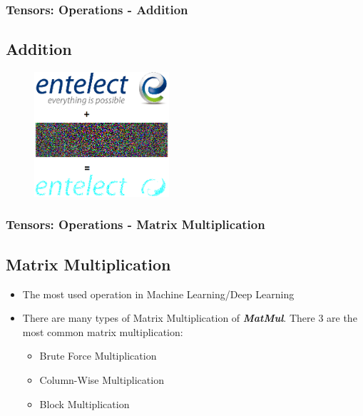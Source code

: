 \documentclass[11pt]{beamer}
\begin{document}
\begin{frame}
	\frametitle{Tensors: Operations - Addition}
	\subsection{Addition}
		 \begin{figure}
		\includegraphics[width=50mm,scale=0.7]{add_noise}
	\end{figure}
\end{frame}

\begin{frame}
	\frametitle{Tensors: Operations - Matrix Multiplication}
	\subsection{Matrix Multiplication}
\begin{itemize}
	\item The most used operation in Machine Learning/Deep Learning
	\item There are many types of Matrix Multiplication of \textit{\textbf{MatMul}}. There 3 are the most common matrix multiplication:
	\begin{itemize}
		\item Brute Force Multiplication
		\item Column-Wise Multiplication
		\item Block Multiplication		
	\end{itemize}
\end{itemize}
\end{frame}
\end{document}

